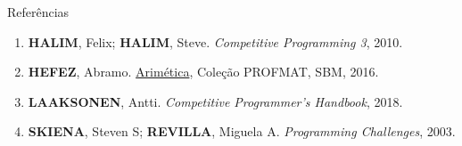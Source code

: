 \begin{frame}[fragile]{Referências}

    \begin{enumerate}
        \item \textbf{HALIM}, Felix; \textbf{HALIM}, Steve. \textit{Competitive Programming 3}, 2010.

        \item \textbf{HEFEZ}, Abramo. \href{https://loja.sbm.org.br/index.php/aritmetica.html}{Arimética}, Coleção PROFMAT, SBM, 2016.


        \item \textbf{LAAKSONEN}, Antti. \textit{Competitive Programmer's Handbook}, 2018.

        \item \textbf{SKIENA}, Steven S; \textbf{REVILLA}, Miguela A. \textit{Programming Challenges}, 2003.
    \end{enumerate}

\end{frame}
